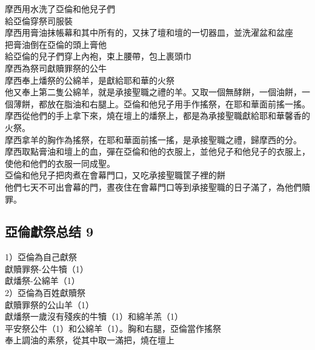   
摩西用水洗了亞倫和他兒子們\\
給亞倫穿祭司服裝\\
摩西用膏油抹帳幕和其中所有的，又抹了壇和壇的一切器皿，並洗濯盆和盆座\\
把膏油倒在亞倫的頭上膏他\\
給亞倫的兒子們穿上內袍，束上腰帶，包上裹頭巾\\
摩西為祭司獻贖罪祭的公牛 \\
摩西奉上燔祭的公綿羊，是獻給耶和華的火祭\\
他又奉上第二隻公綿羊，就是承接聖職之禮的羊。又取一個無酵餅，一個油餅，一個薄餅，都放在脂油和右腿上。亞倫和他兒子用手作搖祭，在耶和華面前搖一搖。摩西從他們的手上拿下來，燒在壇上的燔祭上，都是為承接聖職獻給耶和華馨香的火祭。\\
摩西拿羊的胸作為搖祭，在耶和華面前搖一搖，是承接聖職之禮，歸摩西的分。\\
摩西取點膏油和壇上的血，彈在亞倫和他的衣服上，並他兒子和他兒子的衣服上，使他和他們的衣服一同成聖。\\
亞倫和他兒子把肉煮在會幕門口，又吃承接聖職筐子裡的餅\\
他們七天不可出會幕的門，晝夜住在會幕門口等到承接聖職的日子滿了，為他們贖罪。



\subsection{亞倫獻祭总结 9}
1）亞倫為自己獻祭\\
獻贖罪祭-公牛犢（1）\\
獻燔祭-公綿羊（1）\\
2）亞倫為百姓獻贖祭\\
獻贖罪祭的公山羊（1）\\
獻燔祭一歲沒有殘疾的牛犢（1）和綿羊羔（1）\\
平安祭公牛（1）和公綿羊（1）。胸和右腿，亞倫當作搖祭\\
奉上調油的素祭，從其中取一滿把，燒在壇上


